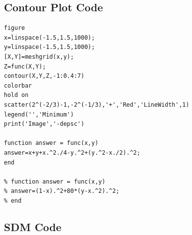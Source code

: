 \documentclass[10pt,a4paper,notitlepage]{article}
\begin{document}
\subsection*{\centering Contour Plot Code}\label{cd:0.5}
\begin{verbatim}
figure
x=linspace(-1.5,1.5,1000);
y=linspace(-1.5,1.5,1000);
[X,Y]=meshgrid(x,y);
Z=func(X,Y);
contour(X,Y,Z,-1:0.4:7)
colorbar
hold on
scatter(2^(-2/3)-1,-2^(-1/3),'+','Red','LineWidth',1)
legend('','Minimum')
print('Image','-depsc')

function answer = func(x,y)
answer=x+y+x.^2./4-y.^2+(y.^2-x./2).^2;
end

% function answer = func(x,y)
% answer=(1-x).^2+80*(y-x.^2).^2;
% end
\end{verbatim}
\pagebreak

\subsection*{\centering SDM Code}\label{cd:1}
\end{document}
